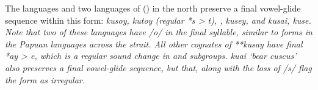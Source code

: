 The  languages and two languages of 
() in the north preserve a final vowel-glide
sequence within this form:  \it{kusoy},
 \it{kutoy} (regular *s > \it{t}),
,  \it{kusey}, and  \it{kusai, kuse}.
Note that two of these languages have /o/ in the final syllable,
similar to forms in the Papuan  languages across the strait.
All other cognates of **kusay have final *ay > \it{e},
which is a regular sound change in 
and  subgroups.
 \it{kuai} ‘bear cuscus’ also preserves a final vowel-glide
sequence, but that, along with the loss of /s/ flag the  form as irregular.